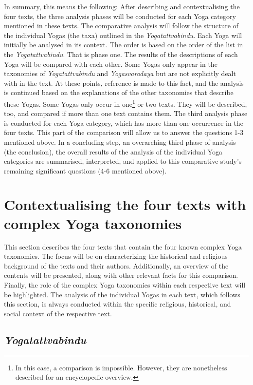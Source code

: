 In summary, this means the following: After describing and contextualising the four texts, the three analysis phases will be conducted for each Yoga category mentioned in these texts. The comparative analysis will follow the structure of the individual Yogas (the taxa) outlined in the \textit{Yogatattvabindu}. Each Yoga will initially be analysed in its context. The order is based on the order of the list in the \textit{Yogatattvabindu}. That is phase one. The results of the descriptions of each Yoga will be compared with each other. Some Yogas only appear in the taxonomies of \textit{Yogatattvabindu} and \textit{Yogasvarodaya} but are not explicitly dealt with in the text. At these points, reference is made to this fact, and the analysis is continued based on the explanations of the other taxonomies that describe these Yogas. Some Yogas only occur in one\footnote{In this case, a comparison is impossible. However, they are nonetheless described for an encyclopedic overview.} or two texts. They will be described, too, and compared if more than one text contains them. The third analysis phase is conducted for each Yoga category, which has more than one occurrence in the four texts. This part of the comparison will allow us to answer the questions 1-3 mentioned above. In a concluding step, an overarching third phase of analysis (the conclusion), the overall results of the analysis of the individual Yoga categories are summarised, interpreted, and applied to this comparative study's remaining significant questions (4-6 mentioned above). 

\section{Contextualising the four texts with complex Yoga taxonomies}

This section describes the four texts that contain the four known complex Yoga taxonomies. The focus will be on characterizing the historical and religious background of the texts and their authors. Additionally, an overview of the contents will be presented, along with other relevant facts for this comparison. Finally, the role of the complex Yoga taxonomies within each respective text will be highlighted. The analysis of the individual Yogas in each text, which follows this section, is always conducted within the specific religious, historical, and social context of the respective text. 

\subsection{\emph{Yogatattvabindu}}

